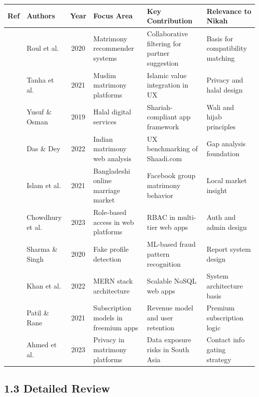 \documentclass[conference]{IEEEtran}
\begin{document}
\begin{table}[htbp]
\centering
\renewcommand{\arraystretch}{1.3}
\begin{tabularx}{\textwidth}{|l|l|c|X|X|X|}
\hline
\textbf{Ref} & \textbf{Authors} & \textbf{Year} & \textbf{Focus Area} & \textbf{Key Contribution} & \textbf{Relevance to Nikah} \\ \hline
[1] & Roul et al. & 2020 & Matrimony recommender systems & Collaborative filtering for partner suggestion & Basis for compatibility matching \\ \hline
[2] & Tanha et al. & 2021 & Muslim matrimony platforms & Islamic value integration in UX & Privacy and halal design \\ \hline
[3] & Yusuf \& Osman & 2019 & Halal digital services & Shariah-compliant app framework & Wali and hijab principles \\ \hline
[4] & Das \& Dey & 2022 & Indian matrimony web analysis & UX benchmarking of Shaadi.com & Gap analysis foundation \\ \hline
[5] & Islam et al. & 2021 & Bangladeshi online marriage market & Facebook group matrimony behavior & Local market insight \\ \hline
[6] & Chowdhury et al. & 2023 & Role-based access in web platforms & RBAC in multi-tier web apps & Auth and admin design \\ \hline
[7] & Sharma \& Singh & 2020 & Fake profile detection & ML-based fraud pattern recognition & Report system design \\ \hline
[8] & Khan et al. & 2022 & MERN stack architecture & Scalable NoSQL web apps & System architecture basis \\ \hline
[9] & Patil \& Rane & 2021 & Subscription models in freemium apps & Revenue model and user retention & Premium subscription logic \\ \hline
[10] & Ahmed et al. & 2023 & Privacy in matrimony platforms & Data exposure risks in South Asia & Contact info gating strategy \\ \hline
\end{tabularx}
\end{table}

\subsection*{1.3 Detailed Review}
\end{document}
